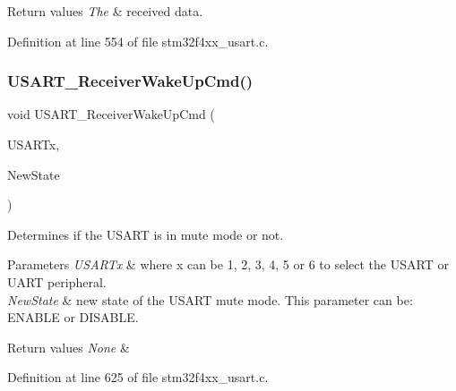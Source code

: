 \begin{DoxyRetVals}{Return values}
{\em The} & received data. \\
\hline
\end{DoxyRetVals}


Definition at line 554 of file stm32f4xx\+\_\+usart.\+c.

\mbox{\label{group___u_s_a_r_t_gac27b78ce445a16fe33851d2f87781c02}} 
\subsubsection{\texorpdfstring{U\+S\+A\+R\+T\+\_\+\+Receiver\+Wake\+Up\+Cmd()}{USART\_ReceiverWakeUpCmd()}}
{\footnotesize\ttfamily void U\+S\+A\+R\+T\+\_\+\+Receiver\+Wake\+Up\+Cmd (\begin{DoxyParamCaption}\item[{\hyperlink{struct_u_s_a_r_t___type_def}{U\+S\+A\+R\+T\+\_\+\+Type\+Def} $\ast$}]{U\+S\+A\+R\+Tx,  }\item[{Functional\+State}]{New\+State }\end{DoxyParamCaption})}



Determines if the U\+S\+A\+RT is in mute mode or not. 


\begin{DoxyParams}{Parameters}
{\em U\+S\+A\+R\+Tx} & where x can be 1, 2, 3, 4, 5 or 6 to select the U\+S\+A\+RT or U\+A\+RT peripheral. \\
\hline
{\em New\+State} & new state of the U\+S\+A\+RT mute mode. This parameter can be\+: E\+N\+A\+B\+LE or D\+I\+S\+A\+B\+LE. \\
\hline
\end{DoxyParams}

\begin{DoxyRetVals}{Return values}
{\em None} & \\
\hline
\end{DoxyRetVals}


Definition at line 625 of file stm32f4xx\+\_\+usart.\+c.

\mbox{\label{group___u_s_a_r_t_ga39a3d33e23ee28529fa8f7259ce6811e}} 
